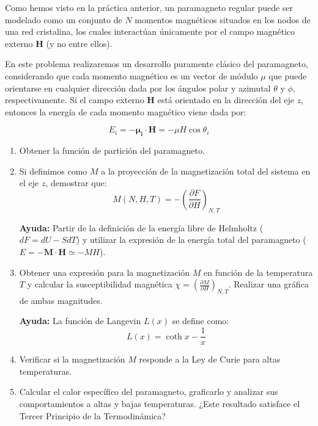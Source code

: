 \documentclass[a4paper,11pt]{article}
\begin{document}
Como hemos visto en la práctica anterior, un paramagneto regular puede ser 
modelado como un conjunto de $N$ momentos magnéticos situados en los 
nodos de una red cristalina, los cuales interactúan únicamente por el campo 
magnético externo $\textbf{H}$ (y no entre ellos).

En este problema realizaremos un desarrollo puramente clásico del 
paramagneto, considerando que cada momento magnético es un vector de 
módulo $\mu$ que puede orientarse en cualquier dirección dada por los 
ángulos polar y azimutal $\theta$ y $\phi$, respectivamente.
Si el campo externo $\textbf{H}$ está orientado en la dirección del eje 
$z$, entonces la energía de cada momento magnético viene dada por:

$$ E_i = - \boldsymbol{\mu_i} \cdot \textbf{H} = - \mu H \cos \theta_i $$


\begin{enumerate}[label=(\alph*),
                  leftmargin=2\parindent,
                  rightmargin=2\parindent]

    \item{Obtener la función de partición del paramagneto.}
    
    \item{Si definimos como $M$ a la proyección de la magnetización total del 
          sistema en el eje $z$, demostrar que:
          $$ M(N, H, T) = - \left( \frac{\partial F}{\partial H} 
          \right)_{N, T}$$
          }
    
    {\small
    \textbf{Ayuda:}
    Partir de la definición de la energía libre de Helmholtz ($ dF = dU 
    - S dT$) y utilizar la expresión de la energía total del 
    paramagneto ($ E = - \textbf{M} \cdot \textbf{H} \simeq - MH$).
    }
    
    \item{Obtener una expresión para la magnetización $M$ en función 
          de la temperatura $T$ y calcular la susceptibilidad magnética 
          $\chi = \left( \frac{\partial M}{\partial H} \right)_{N, T}$.
          Realizar una gráfica de ambas magnitudes.}

    {\small
    \textbf{Ayuda:} La función de Langevin $L(x)$ se define como:
    $$ L(x) = \coth x - \frac{1}{x} $$
    }
    
    \item{Verificar si la magnetización $M$ responde a la Ley de Curie 
          para altas temperaturas.}
    
    \item{Calcular el calor específico del paramagneto, graficarlo y 
          analizar sus comportamientos a altas y bajas temperaturas. 
          ¿Este resultado satisface el Tercer Principio de la 
          Termodinámica?}


\end{enumerate}
\end{document}
